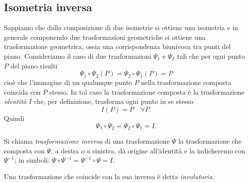 			
\subsection{Isometria inversa}
			
Sappiamo che dalla composizione di due isometrie si ottiene una isometria e in generale componendo due trasformazioni geometriche si ottiene una trasformazione geometrica, ossia una corrispondenza biunivoca tra punti del piano.
Consideriamo il caso di due trasformazioni $\Psi_1$ e $\Psi_2$ tali che per ogni punto $P$ del piano risulti
\[\Psi_1 \circ \Psi_2 (P) = \Psi_2 \circ \Psi_1 (P) = P\]
cioè che l'immagine di un qualunque punto $P$ nella trasformazione composta coincida con $P$ stesso. In tal caso la trasformazione composta è la trasformazione \emph{identità} $I$ che, per definizione, trasforma ogni punto in se stesso
\[I(P) = P\quad \forall P.\]
Quindi
\[\Psi_1 \circ \Psi_2 = \Psi_2 \circ \Psi_1 = I.\]

\begin{definizione}
Si chiama \emph{trasformazione inversa} di una trasformazione $\Psi$ la trasformazione che composta con $\Psi$, a destra o a sinistra, dà origine all'identità e la indicheremo con $\Psi^{-1}$; in simboli: $\Psi \circ \Psi^{-1} = \Psi^{-1} \circ \Psi = I$.
\end{definizione}
			
\begin{definizione}
Una trasformazione che coincide con la sua inversa è detta \emph{involutoria}.
\end{definizione}

		
\newpage
			

			
\cleardoublepage
